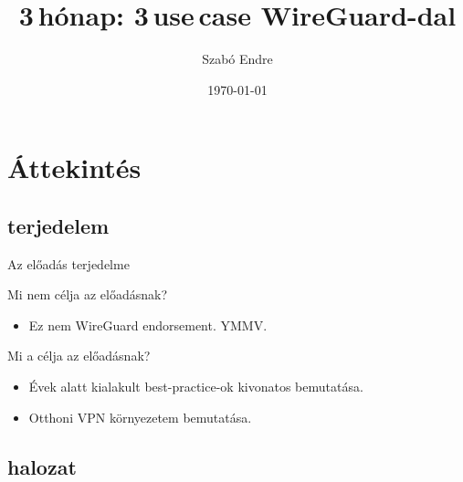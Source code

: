\documentclass[aspectratio=169]{beamer}
\title{3\,hónap: 3\,use\,case WireGuard-dal}
\author{Szabó Endre}
\institute[HSBP Meetup]{Hackerspace Budapest Online Meetup}
\date[\today]{\today}
\begin{document}
{
\frame{\titlepage}
}

\section{Áttekintés}
\subsection{terjedelem}

\begin{frame}{Az előadás terjedelme}

	Mi nem célja az előadásnak?
		\pause
		\begin{itemize}
			\item Ez nem WireGuard endorsement. YMMV.
		\end{itemize}

		\pause

	Mi a célja az előadásnak?

		\pause

		\begin{itemize}
			\item Évek alatt kialakult best-practice-ok kivonatos bemutatása.
			\item Otthoni VPN környezetem bemutatása.
		\end{itemize}



\end{frame}

\subsection{halozat}
\end{document}
